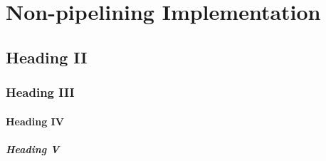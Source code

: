 \section{Non-pipelining Implementation}
\subsection{Heading II}
\subsubsection{Heading III}
\paragraph{Heading IV}
\subparagraph{Heading V}
